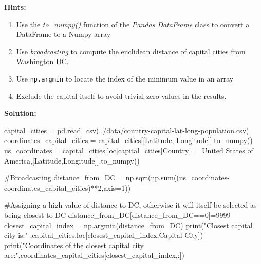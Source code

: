 \documentclass[
  letterpaper,
  DIV=11,
  numbers=noendperiod]{scrreprt}
\newenvironment{Shaded}{\begin{snugshade}}{\end{snugshade}}
\newcommand{\BuiltInTok}[1]{\textcolor[rgb]{0.00,0.23,0.31}{#1}}
\newcommand{\CommentTok}[1]{\textcolor[rgb]{0.37,0.37,0.37}{#1}}
\newcommand{\DecValTok}[1]{\textcolor[rgb]{0.68,0.00,0.00}{#1}}
\newcommand{\NormalTok}[1]{\textcolor[rgb]{0.00,0.23,0.31}{#1}}
\newcommand{\OperatorTok}[1]{\textcolor[rgb]{0.37,0.37,0.37}{#1}}
\newcommand{\StringTok}[1]{\textcolor[rgb]{0.13,0.47,0.30}{#1}}
\providecommand{\tightlist}{%
  \setlength{\itemsep}{0pt}\setlength{\parskip}{0pt}}\usepackage{longtable,booktabs,array}
\begin{document}
\textbf{Hints:}

\begin{enumerate}
\def\labelenumi{\arabic{enumi}.}
\tightlist
\item
  Use the \emph{to\_numpy()} function of the \emph{Pandas DataFrame}
  class to convert a DataFrame to a Numpy array
\item
  Use \emph{broadcasting} to compute the euclidean distance of capital
  cities from Washington DC.
\item
  Use \texttt{np.argmin} to locate the index of the minimum value in an
  array
\item
  Exclude the capital itself to avoid trivial zero values in the
  results.
\end{enumerate}

\textbf{Solution:}

\begin{Shaded}
\begin{Highlighting}[]

\NormalTok{capital\_cities }\OperatorTok{=}\NormalTok{ pd.read\_csv(}\StringTok{\textquotesingle{}../data/country{-}capital{-}lat{-}long{-}population.csv\textquotesingle{}}\NormalTok{)}
\NormalTok{coordinates\_capital\_cities }\OperatorTok{=}\NormalTok{ capital\_cities[[}\StringTok{\textquotesingle{}Latitude\textquotesingle{}}\NormalTok{, }\StringTok{\textquotesingle{}Longitude\textquotesingle{}}\NormalTok{]].to\_numpy()}
\NormalTok{us\_coordinates }\OperatorTok{=}\NormalTok{ capital\_cities.loc[capital\_cities[}\StringTok{\textquotesingle{}Country\textquotesingle{}}\NormalTok{]}\OperatorTok{==}\StringTok{\textquotesingle{}United States of America\textquotesingle{}}\NormalTok{,[}\StringTok{\textquotesingle{}Latitude\textquotesingle{}}\NormalTok{,}\StringTok{\textquotesingle{}Longitude\textquotesingle{}}\NormalTok{]].to\_numpy()}

\CommentTok{\#Broadcasting}
\NormalTok{distance\_from\_DC }\OperatorTok{=}\NormalTok{ np.sqrt(np.}\BuiltInTok{sum}\NormalTok{((us\_coordinates}\OperatorTok{{-}}\NormalTok{coordinates\_capital\_cities)}\OperatorTok{**}\DecValTok{2}\NormalTok{,axis}\OperatorTok{=}\DecValTok{1}\NormalTok{))}

\CommentTok{\#Assigning a high value of distance to DC, otherwise it will itself be selected as being closest to DC}
\NormalTok{distance\_from\_DC[distance\_from\_DC}\OperatorTok{==}\DecValTok{0}\NormalTok{]}\OperatorTok{=}\DecValTok{9999}
\NormalTok{closest\_capital\_index }\OperatorTok{=}\NormalTok{ np.argmin(distance\_from\_DC)}
\BuiltInTok{print}\NormalTok{(}\StringTok{"Closest capital city is:"}\NormalTok{ ,capital\_cities.loc[closest\_capital\_index,}\StringTok{\textquotesingle{}Capital City\textquotesingle{}}\NormalTok{])}
\BuiltInTok{print}\NormalTok{(}\StringTok{"Coordinates of the closest capital city are:"}\NormalTok{,coordinates\_capital\_cities[closest\_capital\_index,:])}
\end{Highlighting}
\end{Shaded}
\end{document}
